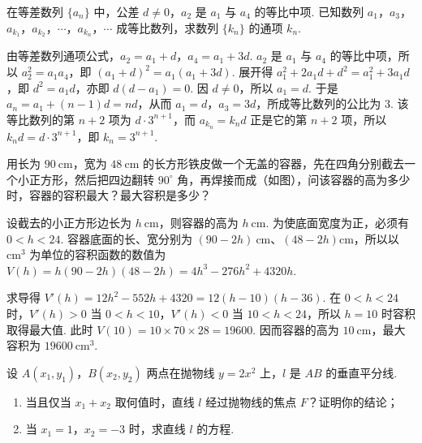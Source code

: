 \begin{problem}
在等差数列 \(\{a_{n}\}\) 中，公差 \(d \neq 0\)，\(a_{2}\) 是 \(a_{1}\) 与 \(a_{4}\) 的等比中项. 已知数列 \(a_{1}\)，\(a_{3}\)，\(a_{k_{1}}\)，\(a_{k_{2}}\)，\(\cdots\)，\(a_{k_{n}}\)，\(\cdots\) 成等比数列，求数列 \(\{k_{n}\}\) 的通项 \(k_{n}\).
\end{problem}

\begin{solution}
由等差数列通项公式，\(a_2=a_1+d\)，\(a_4=a_1+3d\). \(a_2\) 是 \(a_1\) 与 \(a_4\) 的等比中项，所以 \(a_2^2=a_1a_4\)，即 \((a_1+d)^2=a_1(a_1+3d)\). 展开得 \(a_1^2+2a_1d+d^2=a_1^2+3a_1d\)，即 \(d^2=a_1d\)，亦即 \(d(d-a_1)=0\). 因 \(d\ne0\)，所以 \(a_1=d\). 于是 \(a_n=a_1+(n-1)d=nd\)，从而 \(a_1=d\)，\(a_3=3d\)，所成等比数列的公比为 \(3\). 该等比数列的第 \(n+2\) 项为 \(d\cdot3^{n+1}\)，而 \(a_{k_n}=k_nd\) 正是它的第 \(n+2\) 项，所以 \(k_nd=d\cdot3^{n+1}\)，即 \(k_n=3^{n+1}\).
\end{solution}


\begin{problem}
用长为 \(90 \mathrm{~cm}\)，宽为 \(48 \mathrm{~cm}\) 的长方形铁皮做一个无盖的容器，先在四角分别截去一个小正方形，然后把四边翻转 \(90^{\circ}\) 角，再焊接而成（如图），问该容器的高为多少时，容器的容积最大？最大容积是多少？


\end{problem}

\begin{solution}
设截去的小正方形边长为 \(h\mathrm{~cm}\)，则容器的高为 \(h\mathrm{~cm}\). 为使底面宽度为正，必须有 \(0<h<24\). 容器底面的长、宽分别为 \((90-2h)\mathrm{~cm}\)、\((48-2h)\mathrm{cm}\)，所以以 \(\mathrm{cm}^3\) 为单位的容积函数的数值为
\(V(h)=h(90-2h)(48-2h)=4h^3-276h^2+4320h\).

求导得 \(V'(h)=12h^2-552h+4320=12(h-10)(h-36)\). 在 \(0<h<24\) 时，\(V'(h)>0\) 当 \(0<h<10\)，\(V'(h)<0\) 当 \(10<h<24\)，所以 \(h=10\) 时容积取得最大值. 此时
\(V(10)=10\times70\times28=19600\). 因而容器的高为 \(10\mathrm{~cm}\)，最大容积为 \(19600\mathrm{~cm}^3\).
\end{solution}


\begin{problem}
设 \(A(x_{1}, y_{1})\)，\(B(x_{2}, y_{2})\) 两点在抛物线 \(y = 2x^{2}\) 上，\(l\) 是 \(AB\) 的垂直平分线.

\begin{enumerate}
\item 当且仅当 \(x_{1} + x_{2}\) 取何值时，直线 \(l\) 经过抛物线的焦点 \(F\)？证明你的结论；
\item 当 \(x_{1} = 1\)，\(x_{2} = -3\) 时，求直线 \(l\) 的方程.
\end{enumerate}
\end{problem}

